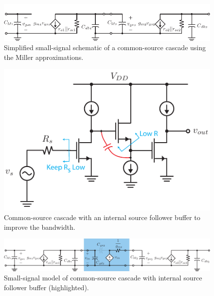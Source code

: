\begin{figure}[H]
\centering
\includegraphics[scale=1.05]{4cs_casc_ss_cap_miller}
\caption{Simplified small-signal schematic of a common-source cascade using the Miller approximations.}
\label{fig:4cs_casc_ss_cap_miller}
\end{figure}
\newpage
\begin{figure}[t]
\centering
\includegraphics[scale=1.35]{55cs_cd_cs_casc}
\caption{Common-source cascade with an internal source follower buffer to improve the bandwidth.}
\label{fig:55cs_cd_cs_casc}
\end{figure}
\begin{figure}[H]
\centering
\includegraphics[width=\columnwidth]{5cs_cd_cs_casc_ss_miller}
\caption{Small-signal model of common-source cascade with internal source follower buffer (highlighted).}
\label{fig:5cs_cd_cs_casc_ss_miller}
\end{figure}
